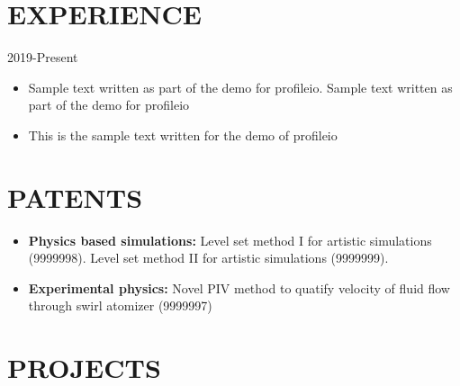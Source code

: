 \documentclass{res}
\begin{document}
\begin{resume}
	
	
	\section{\MakeUppercase{Experience}} \vskip 0.15in
	
	\hspace*{-0.25in}{\bf Research Assistant} \hfill 2019-Present \\
	\hspace*{-0.25in}{\it Texas A\&M University, College, TX}
	\begin{itemize}[leftmargin=\parindent]
	\setlength{\itemsep}{0mm} \smallskip
	
		\item Sample text written as part of the demo for profileio. Sample text written as part of the demo for profileio
		\item This is the sample text written for the demo of profileio
	\end{itemize}
	
	
	
	
	\section{\MakeUppercase{Patents}} \vskip 0.35in
	\begin{itemize}[leftmargin=\parindent]
	\setlength{\itemsep}{6pt}
	
		\item[] {\bf Physics based simulations:} Level set method I for artistic simulations (9999998). Level set method II for artistic simulations (9999999).
		\item[] {\bf Experimental physics:} Novel PIV method to quatify velocity of fluid flow through swirl atomizer (9999997)
	\end{itemize}
	
		
	
	\section{\MakeUppercase{Projects}} \vskip 0.15in
	

\end{resume}
\end{document}
